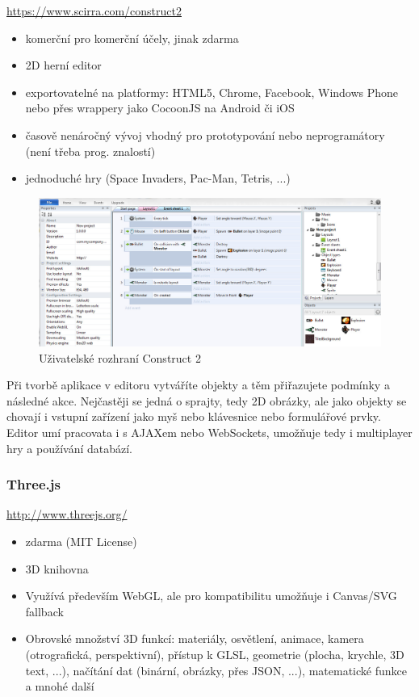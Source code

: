\documentclass[12pt,a4paper,titlepage,final]{report}
\begin{document}
\url{https://www.scirra.com/construct2}

\begin{itemize}
	\item komerční pro komerční účely, jinak zdarma
	\item 2D herní editor
	\item exportovatelné na platformy: HTML5, Chrome, Facebook, Windows Phone nebo přes wrappery jako CocoonJS na Android či iOS
	\item časově nenáročný vývoj vhodný pro prototypování nebo neprogramátory (není třeba prog. znalostí)
	\item jednoduché hry (Space Invaders, Pac-Man, Tetris, ...)
\end{itemize}

\begin{figure}[ht]
\begin{center}
\includegraphics[width=14cm]{images/construct2.jpg}
\caption{Uživatelské rozhraní Construct 2}
\label{fig:theory}
\end{center}
\end{figure}

Při tvorbě aplikace v editoru vytváříte objekty a těm přiřazujete podmínky a následné akce. Nejčastěji se jedná o sprajty, tedy 2D obrázky, ale jako objekty se chovají i vstupní zařízení jako myš nebo klávesnice nebo formulářové prvky. Editor umí pracovata i s AJAXem nebo WebSockets, umožňuje tedy i multiplayer hry a používání databází.

\subsubsection{Three.js}

\url{http://www.threejs.org/}

\begin{itemize}
	\item zdarma (MIT License)
	\item 3D knihovna
	\item Využívá především WebGL, ale pro kompatibilitu umožňuje i Canvas/SVG fallback
	\item Obrovské množství 3D funkcí: materiály, osvětlení, animace, kamera (otrografická, perspektivní), přístup k GLSL, geometrie (plocha, krychle, 3D text, ...), načítání dat (binární, obrázky, přes JSON, ...), matematické funkce a mnohé další	
\end{itemize}
\end{document}
